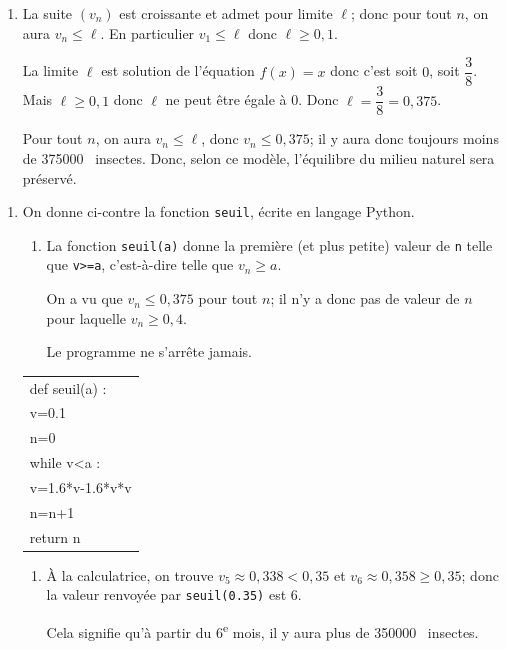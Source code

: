 \documentclass[10pt]{article}
\providecommand{\ieme}{\textsuperscript{e}}
\providecommand{\np}[2][]{{#2~#1}}
\begin{document}
\begin{enumerate}
\begin{enumerate}
On note $\ell$ la valeur de sa limite. On admet que $\ell$ est solution de l'équation $f(x) = x$.

		\item 
La suite $(v_n)$ est croissante et admet pour limite $\ell$; donc pour tout $n$, on aura $v_n \leqslant \ell$. En particulier $v_1\leqslant \ell$ donc $\ell\geqslant 0,1$.

La limite $\ell$ est solution de l'équation $f(x) = x$ donc c'est soit $0$, soit $\dfrac{3}{8}$. Mais $\ell\geqslant 0,1$ donc $\ell$ ne peut être égale à 0.
Donc $\ell=\dfrac{3}{8}=0,375$.		
		
Pour tout $n$, on aura $v_n\leqslant \ell$, donc $v_n \leqslant 0,375$; il y aura donc toujours moins de \np{375000} insectes. Donc, selon ce modèle,  l'équilibre du milieu naturel sera préservé.
	\end{enumerate}	
\end{enumerate}

\begin{enumerate}[resume]
\item  On donne ci-contre la fonction \texttt{seuil}, écrite en langage Python.

\begin{minipage}{0.6\linewidth}
	\begin{enumerate}
		\item 
La fonction \texttt{seuil(a)} donne la première (et plus petite) valeur de \texttt{n} telle que \texttt{v>=a}, c'est-à-dire telle que $v_n\geqslant a$.

On a vu que $v_n\leqslant 0,375$ pour tout $n$; il n'y a donc pas de valeur de $n$ pour laquelle $v_n\geqslant 0,4$.

Le programme ne s'arrête jamais.
	\end{enumerate}
\end{minipage}\hfill
\begin{minipage}{0.36\linewidth}
\begin{tabularx}{\linewidth}{|X|}\hline
def seuil(a) :\\
\qquad v=0.1\\
\qquad n=0\\
\qquad while v<a :\\
\qquad \qquad v=1.6*v-1.6*v*v\\
\qquad \qquad n=n+1\\
\qquad return n\\ \hline
\end{tabularx}
\end{minipage}

\begin{enumerate}[resume]
		\item 
À la calculatrice, on trouve $v_5\approx 0,338 <0,35$ et $v_6\approx 0,358 \geqslant 0,35$; donc la valeur renvoyée par \texttt{seuil(0.35)} est 6.
		

Cela signifie qu'à partir du 6\ieme{} mois, il y aura plus de \np{350000} insectes.
\end{enumerate}	

\end{enumerate}	

\bigskip
\end{document}

